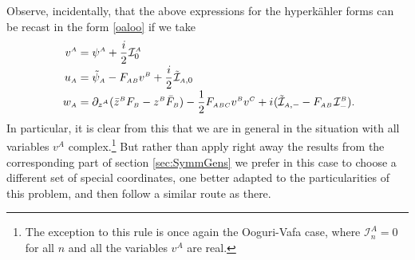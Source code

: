 \documentclass[11pt]{amsart}
\theoremstyle{remark}
\theoremstyle{remark}
\theoremstyle{definition}
\theoremstyle{definition}
\theoremstyle{definition}
\newcommand{\0}{{\scriptstyle 0'}} %
\newcommand{\1}{{\scriptstyle 1'}}
\newcommand{\A}{{\scriptscriptstyle A}} %
\newcommand{\B}{{\scriptscriptstyle B}}
\newcommand{\C}{{\scriptscriptstyle C}}
\newcommand{\pt}{\hspace{1pt}} %
\newcommand{\hp}{\hspace{0.5pt}} %
\newcommand{\nhp}{\hspace{-0.5pt}} %
\begin{document}
Observe, incidentally, that the above expressions for the hyperk\"ahler forms can be recast in the form \eqref{oaloo} if we take
{\allowdisplaybreaks
\begin{equation}
\begin{aligned}
v^{\A} & = \psi^{\A} + \frac{i}{2} \hp \mathcal{I}^{\A}_0 \\[-2pt]
u_{\A} & = \tilde{\psi}_{\A} - F_{\A\B}v^{\B} + \frac{i}{2} \hp \tilde{\mathcal{I}}_{\A,0} \\[-2pt]
w_{\A} & = \partial_{\smash{z^{\A}}}(\bar{z}^{\B}F_{\B} - z^{\B}\bar{F}_{\B}) - \frac{1}{2} F_{\A\B\C} v^{\B}v^{\C} +  i \hp (\tilde{\mathcal{I}}_{\A,-} \nhp - F_{\A\B} \pt \mathcal{I}^{\B}_-)
\rlap{.}
\end{aligned}
\end{equation}
}%
In particular, it is clear from this that we are in general in the situation with all variables $v^{\A}$ complex.\footnote{\pt The exception to this rule is once again the Ooguri-Vafa case, where \mbox{$\mathcal{I}^{\A}_n = 0$} for all $n$ and all the variables $v^{\A}$ are real.} But rather than apply right away the results from the corresponding part of section \ref{sec:SymmGens} we prefer in this case to choose a different set of special coordinates, one better adapted to the particularities of this problem, and then follow a similar route as there. 
\end{document}
